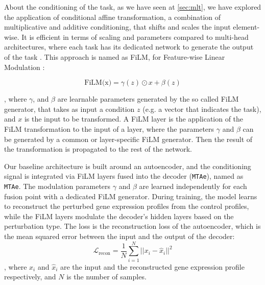 \documentclass[12pt, a4paper]{article}
\begin{document}
About the conditioning of the task, as we have seen at \cref{sec:mlt}, we have explored the application of conditional affine transformation, a combination of multiplicative and additive conditioning, that shifts and scales the input element-wise. It is efficient in terms of scaling and parameters compared to multi-head architectures, where each task has its dedicated network to generate the output of the task . This approach is named as FiLM, for Feature-wise Linear Modulation \cite{dumoulin2018feature-wise, perez2018film}:

\[ \text{FiLM(x)} = \gamma (z) \odot x + \beta (z) \]

, where $\gamma$, and $\beta$ are learnable parameters generated by the so called FiLM generator, that takes as input a condition $z$ (e.g. a vector that indicates the task), and $x$ is the input to be transformed. 
A FiLM layer is the application of the FiLM transformation to the input of a layer, where the parameters $\gamma$ and $\beta$ can be generated by a common or layer-specific FiLM generator.   Then the result of the transformation is propagated to the rest of the network.




Our baseline architecture is built around an autoencoder, and the conditioning signal is integrated via FiLM layers fused into the decoder (\verb|MTAe|), named as \verb|MTAe|. The modulation parameters $\gamma$ and $\beta$ are learned independently for each fusion point with a dedicated FiLM generator.
During training, the model learns to reconstruct the perturbed gene expression profiles from the control profiles, while the FiLM layers modulate the decoder's hidden layers based on the perturbation type.
The loss is the reconstruction loss of the autoencoder, which is the mean squared error between the input and the output of the decoder:
\[
\mathcal{L}_{\text{recon}} = \frac{1}{N} \sum_{i=1}^{N} ||x_i - \hat{x}_i||^2 \]
, where $x_i$ and $\hat{x}_i$ are the input and the reconstructed gene expression profile respectively, and $N$ is the number of samples.
\end{document}
